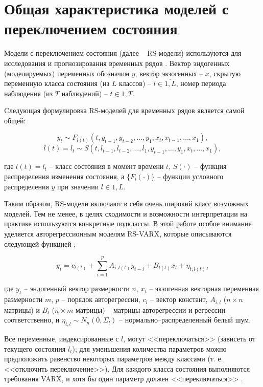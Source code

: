 \documentclass[a4paper,14pt]{extreport}
\begin{document}
\label{chapter:rs_models}

\section{Общая характеристика моделей с переключением состояния}
Модели с переключением состояния (далее – RS-модели) используются для исследования и прогнозирования временных рядов \cite{mal_multidim_nonhomogenous}. Вектор эндогенных (моделируемых) переменных обозначим $y$, вектор экзогенных -- $x$, скрытую переменную класса состояния (из $L$ классов) -- $l \in \overline{1, L}$, номер периода наблюдения (из $T$ наблюдений) -- $t \in \overline{1,T}$.

Cледующая формулировка RS-моделей для временных рядов является самой общей:

\begin{equation}
	y_t \sim F_{l(t)}(t, y_{t-1}, y_{t-2}, \dots, y_1, x_t, x_{t-1}, \dots, x_1) ,
\end{equation}
\begin{equation}
	l(t) = l_t \sim S(t, l_{t-1}, l_{t-2}, \dots, l_1, y_{t-1}, \dots, y_1, x_t, \dots, x_1) ,
\end{equation}

\noindent
где $l(t) = l_t$ -- класс состояния в момент времени $t$, $S(\cdot)$ -- функция распределения изменения состояния, а $\{F_l(\cdot)\}$ -- функции условного распределения $y$ при значении $l \in \overline{1,L}$. 

Таким образом, RS-модели включают в себя очень широкий класс возможных моделей. Тем не менее, в целях сходимости и возможности интерпретации на практике используются конкретные подклассы. В этой работе особое внимание уделяется авторегрессионным моделям RS-VARX, которые описываются следующей функцией \cite{mal_multidim_nonhomogenous}:

\begin{equation}
	y_{t}=c_{l(t)} + \sum_{i=1}^{p} A_{i,l(t)} y_{t-i} + B_{l(t)} x_{t} + \eta_{t, l(t)} ,
\end{equation}

\noindent
где 
$y_t$ -- эндогенный вектор размерности $n$, 
$x_{t}$ -- экзогенная векторная переменная размерности $m$,
$p$ -- порядок авторегрессии, 
$c_{l}$ -- вектор констант,
$A_{i,l}$ ($n \times n$ матрицы) и $B_{l}$ ($n \times m$ матрицы) -- матрицы авторегрессии и регрессии соответственно,
и $\eta_{t, l} \sim N_n(0, \Sigma_{l}) $ -- нормально–распределенный белый шум.

Все переменные, индексированные с $l$, могут <<переключаться>> (зависеть от текущего состояния $l_t$); для уменьшения количества параметров можно предположить равенство некоторых параметров между классами (т. е. <<отключить переключение>>). Для каждого класса состояния выполняются требования VARX, и хотя бы один параметр должен <<переключаться>> \cite{malNovopMSVARX,mal_multidim_nonhomogenous}.
\end{document}
